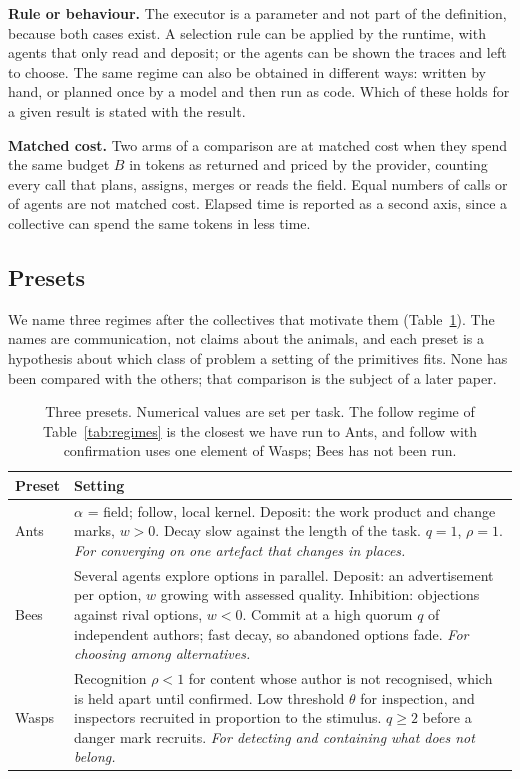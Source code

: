 \documentclass[10pt,twocolumn]{article}
\begin{document}
\textbf{Rule or behaviour.} The executor is a parameter and not part of the definition, because both cases exist. A selection rule can be applied by the runtime, with agents that only read and deposit; or the agents can be shown the traces and left to choose. The same regime can also be obtained in different ways: written by hand, or planned once by a model and then run as code. Which of these holds for a given result is stated with the result.

\textbf{Matched cost.} Two arms of a comparison are at matched cost when they spend the same budget $B$ in tokens as returned and priced by the provider, counting every call that plans, assigns, merges or reads the field. Equal numbers of calls or of agents are not matched cost. Elapsed time is reported as a second axis, since a collective can spend the same tokens in less time.

\subsection{Presets}

We name three regimes after the collectives that motivate them (Table~\ref{tab:presets}). The names are communication, not claims about the animals, and each preset is a hypothesis about which class of problem a setting of the primitives fits. None has been compared with the others; that comparison is the subject of a later paper.

\begin{table}[t]
\centering\small
\begin{tabularx}{\columnwidth}{@{}l Y@{}}
\toprule
Preset & Setting \\
\midrule
Ants & $\alpha$ = field; follow, local kernel. Deposit: the work product and change marks, $w>0$. Decay slow against the length of the task. $q=1$, $\rho=1$. \emph{For converging on one artefact that changes in places.} \\
Bees & Several agents explore options in parallel. Deposit: an advertisement per option, $w$ growing with assessed quality. Inhibition: objections against rival options, $w<0$. Commit at a high quorum $q$ of independent authors; fast decay, so abandoned options fade. \emph{For choosing among alternatives.} \\
Wasps & Recognition $\rho<1$ for content whose author is not recognised, which is held apart until confirmed. Low threshold $\theta$ for inspection, and inspectors recruited in proportion to the stimulus. $q \ge 2$ before a danger mark recruits. \emph{For detecting and containing what does not belong.} \\
\bottomrule
\end{tabularx}
\caption{Three presets. Numerical values are set per task. The follow regime of Table~\ref{tab:regimes} is the closest we have run to Ants, and follow with confirmation uses one element of Wasps; Bees has not been run.}
\label{tab:presets}
\end{table}
\end{document}
